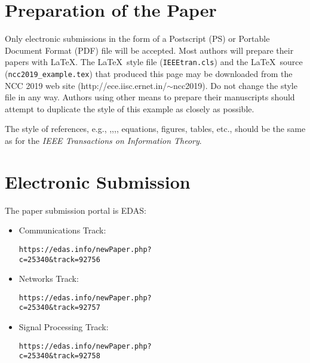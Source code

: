 \documentclass[10pt,conference]{IEEEtran}
\begin{document}

\section{Preparation of the Paper}
Only electronic submissions in the form of a Postscript (PS) or Portable
Document Format (PDF) file will be accepted. Most authors will
prepare their papers with \LaTeX. The \LaTeX\ style file
(\verb#IEEEtran.cls#) and the \LaTeX\ source
(\verb#ncc2019_example.tex#) that produced this page may be
downloaded from the NCC 2019 web site
(http://ece.iisc.ernet.in/$\sim$ncc2019). Do not change the style file
in any way. 
Authors using other means to prepare their manuscripts
should attempt to duplicate the style of this example as closely as
possible.

The style of references, 
e.g.,
\cite{Shannon1948},\cite{Kalman1960},\cite{Rao2008},\cite{Mhatre2009}, 
equations, figures, tables, etc.,
should be the same as for the \emph{IEEE Transactions on Information
Theory}. 

\section{Electronic Submission}
The paper submission portal is EDAS:
\begin{itemize}
\item Communications Track:

{\texttt{https://edas.info/newPaper.php?\\c=25340\&track=92756}}

\item Networks Track:

{\texttt{https://edas.info/newPaper.php?\\c=25340\&track=92757}}

\item Signal Processing Track:

{\texttt{https://edas.info/newPaper.php?\\c=25340\&track=92758}}
\end{itemize}
\end{document}
